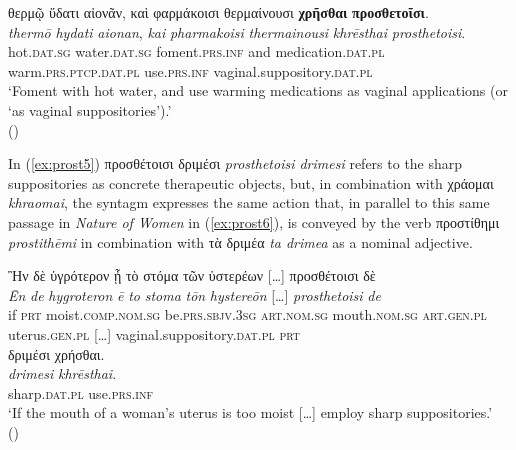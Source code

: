 \documentclass[output=paper,colorlinks,citecolor=brown]{langscibook}
\begin{document}
\begin{exe}
\ex\label{ex:prost4}
\glll θερμῷ ὕδατι αἰονᾶν, καὶ φαρμάκοισι θερμαίνουσι \textbf{χρῆσθαι} \textbf{προσθετοῖσι}. \\ 
\textit{thermō} \textit{hydati} \textit{aionan}, \textit{kai} \textit{pharmakoisi} \textit{thermainousi} \textit{khrēsthai} \textit{prosthetoisi}.\\
hot.\textsc{dat.sg} water.\textsc{dat.sg} foment.\textsc{prs.inf} and medication.\textsc{dat.pl} warm.\textsc{prs.ptcp.dat.pl} use.\textsc{prs.inf} vaginal.suppository.\textsc{dat.pl} \\
\glt ‘Foment with hot water, and use warming medications as vaginal applications (or ‘as vaginal suppositories’).' \\
\hspace*{\fill}()
\end{exe}

In (\ref{ex:prost5}) προσθέτοισι δριμέσι \textit{prosthetoisi drimesi} refers to the sharp suppositories as concrete therapeutic objects, but, in combination with χράομαι \textit{khraomai}, the syntagm expresses the same action that, in parallel to this same passage in \textit{Nature of Women} in (\ref{ex:prost6}), is conveyed by the verb προστίθημι \textit{prostithēmi} in combination with τὰ δριμέα \textit{ta drimea} as a nominal adjective.  

\begin{exe}
\ex\label{ex:prost5}
\glll Ἢν δὲ ὑγρότερον ᾖ τὸ στόμα τῶν ὑστερέων […] προσθέτοισι δὲ \\ 
\textit{Ēn} \textit{de} \textit{hygroteron} \textit{ē} \textit{to} \textit{stoma} \textit{tōn} \textit{hystereōn} […] \textit{prosthetoisi} \textit{de} \\
if \textsc{prt} moist.\textsc{comp.nom.sg} be.\textsc{prs.sbjv.3sg} \textsc{art.nom.sg} mouth.\textsc{nom.sg} \textsc{art.gen.pl} uterus.\textsc{gen.pl} […] vaginal.suppository.\textsc{dat.pl} \textsc{prt}  \\

\glll δριμέσι χρήσθαι. \\
\textit{drimesi} \textit{khrēsthai}. \\
sharp.\textsc{dat.pl} use.\textsc{prs.inf} \\
\glt ‘If the mouth of a woman’s uterus is too moist […] employ sharp suppositories.' \\
\hspace*{\fill}()
\end{exe}
\end{document}
